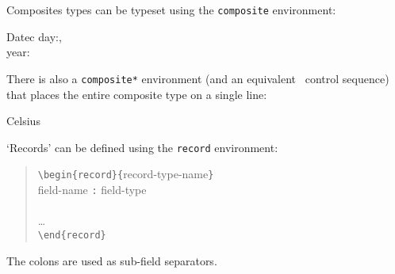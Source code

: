 {Composites types can be typeset using the {\tt composite} environment:

\begin{leftside}
  \begin{composite}{Datec}
    day:, \\
    year:
  \end{composite}
\end{leftside}%

There is also a {\tt composite*} environment (and an equivalent
\cs\scompose\ control sequence) that places the entire composite
type on a single line:

\begin{leftside}
  \begin{composite*}{Celsius}
    \Real
  \end{composite*}
\end{leftside}%

\begin{leftside}
\end{leftside}%

`Records' can be defined using the {\tt record\/} environment:

\begin{verse}
\verb;\begin{record}{;record-type-name\verb;}; \\
field-name \verb;:; field-type \cs\\ \\
\dots \\
\verb;\end{record};
\end{verse}
The colons are used as sub-field separators.

}
